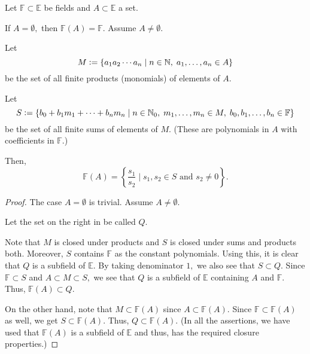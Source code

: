 \begin{prop} \label{prop:FAdesc}
    Let $\mathbb{F} \subset \mathbb{E}$ be fields and $A \subset \mathbb{E}$ a set. 

    If $A = \emptyset,$ then $\mathbb{F}(A) = \mathbb{F}.$ Assume $A \neq \emptyset.$

    Let 
    \begin{equation*} 
        M \vcentcolon= \{a_1a_2 \cdots a_n \mid n \in \mathbb{N},\; a_1, \ldots, a_n \in A\}
    \end{equation*}
    be the set of all finite products (monomials) of elements of $A.$

    Let
    \begin{equation*} 
        S \vcentcolon= \{b_0 + b_1m_1 + \cdots + b_nm_n \mid n \in \mathbb{N}_{0},\; m_1, \ldots, m_n \in M,\;b_0, b_1, \ldots, b_n \in \mathbb{F}\}
    \end{equation*}
    be the set of all finite sums of elements of $M.$ (These are polynomials in $A$ with coefficients in $\mathbb{F}.$)

    Then,
    \begin{equation} \label{eq:FAdesc}
        \mathbb{F}(A) = \left\{\frac{s_1}{s_2} \mid s_1, s_2 \in S \text{ and } s_2 \neq 0\right\}.
    \end{equation}
\end{prop}

\begin{proof} 
    The case $A = \emptyset$ is trivial. Assume $A \neq \emptyset.$

    Let the set on the right in  be called $Q.$ 

    Note that $M$ is closed under products and $S$ is closed under sums and products both. Moreover, $S$ contains $\mathbb{F}$ as the constant polynomials. Using this, it is clear that $Q$ is a subfield of $\mathbb{E}.$ By taking denominator $1,$ we also see that $S \subset Q.$ Since $\mathbb{F} \subset S$ and $A \subset M \subset S,$ we see that $Q$ is a subfield of $\mathbb{E}$ containing $A$ and $\mathbb{F}.$ Thus, $\mathbb{F}(A) \subset Q.$

    On the other hand, note that $M \subset \mathbb{F}(A)$ since $A \subset \mathbb{F}(A).$ Since $\mathbb{F} \subset \mathbb{F}(A)$ as well, we get $S \subset \mathbb{F}(A).$ Thus, $Q \subset \mathbb{F}(A).$ (In all the assertions, we have used that $\mathbb{F}(A)$ is a subfield of $\mathbb{E}$ and thus, has the required closure properties.)
\end{proof}

